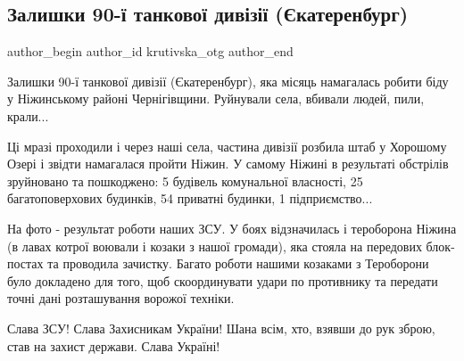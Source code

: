  
 
 
 
 
 
\subsection{Залишки 90-ї танкової дивізії (Єкатеренбург)}
\label{sec:15_04_2022.fb.krutivska_otg.1.zalyshky_divizii_ekaterinburg}
 
\ifcmt
 author_begin
   author_id krutivska_otg
 author_end
\fi

Залишки 90-ї танкової дивізії (Єкатеренбург), яка місяць намагалась робити біду
у Ніжинському районі Чернігівщини. Руйнували села, вбивали людей, пили,
крали... 


Ці мразі проходили і через наші села, частина дивізії розбила штаб у Хорошому
Озері і звідти намагалася пройти Ніжин. У самому Ніжині в результаті обстрілів
зруйновано та пошкоджено: 5 будівель комунальної власності, 25 багатоповерхових
будинків, 54 приватні будинки, 1 підприємство... 


На фото - результат роботи наших ЗСУ. У боях відзначилась і тероборона Ніжина
(в лавах котрої воювали і козаки з нашої громади), яка стояла на передових
блок-постах та проводила зачистку. Багато роботи нашими козаками з Тероборони
було докладено для того, щоб скоординувати удари по противнику та передати
точні дані розташування ворожої техніки.

Слава ЗСУ! Слава Захисникам України! Шана всім, хто, взявши до рук зброю, став
на захист держави. Слава Україні!


